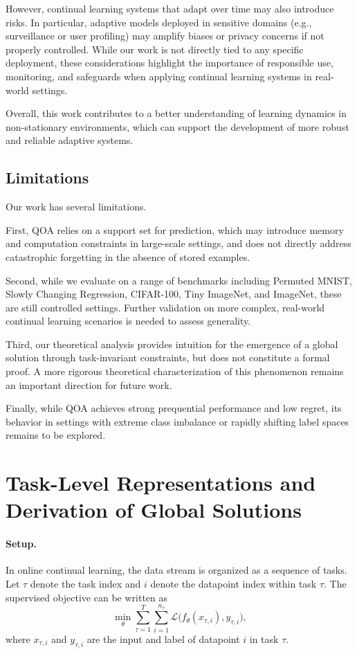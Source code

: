 \documentclass{article}
\begin{document}
However, continual learning systems that adapt over time may also introduce risks. In particular, adaptive models deployed in sensitive domains (e.g., surveillance or user profiling) may amplify biases or privacy concerns if not properly controlled. While our work is not directly tied to any specific deployment, these considerations highlight the importance of responsible use, monitoring, and safeguards when applying continual learning systems in real-world settings.

Overall, this work contributes to a better understanding of learning dynamics in non-stationary environments, which can support the development of more robust and reliable adaptive systems.


\subsection{Limitations}
\label{sec:limitations}
Our work has several limitations.

First, QOA relies on a support set for prediction, which may introduce memory and computation constraints in large-scale settings, and does not directly address catastrophic forgetting in the absence of stored examples.

Second, while we evaluate on a range of benchmarks including Permuted MNIST, Slowly Changing Regression, CIFAR-100, Tiny ImageNet, and ImageNet, these are still controlled settings. Further validation on more complex, real-world continual learning scenarios is needed to assess generality.

Third, our theoretical analysis provides intuition for the emergence of a global solution through task-invariant constraints, but does not constitute a formal proof. A more rigorous theoretical characterization of this phenomenon remains an important direction for future work.

Finally, while QOA achieves strong prequential performance and low regret, its behavior in settings with extreme class imbalance or rapidly shifting label spaces remains to be explored.



\section{Task-Level Representations and Derivation of Global Solutions}
\label{sec:derivation_task_representations}

\paragraph{Setup.}
In online continual learning, the data stream is organized as a sequence of tasks. Let $\tau$ denote the task index and $i$ denote the datapoint index within task $\tau$. The supervised objective can be written as
\begin{equation}
\min_{\theta}
\sum_{\tau=1}^{T}
\sum_{i=1}^{n_\tau}
\mathcal{L}\big(f_\theta(x_{\tau,i}), y_{\tau,i}\big),
\end{equation}
where $x_{\tau,i}$ and $y_{\tau,i}$ are the input and label of datapoint $i$ in task $\tau$.
\end{document}
